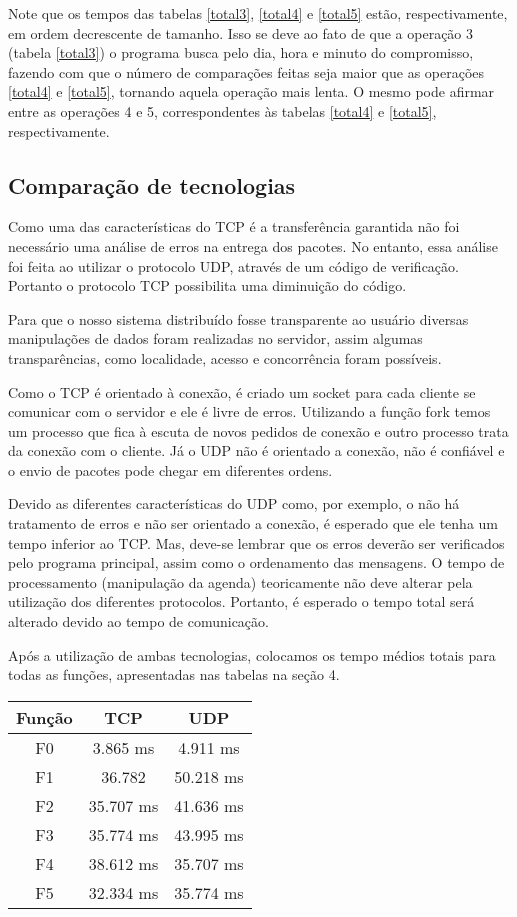 \documentclass[10pt,a4paper]{article}
\begin{document}
  Note que os tempos das tabelas \ref{total3}, \ref{total4} e
  \ref{total5} estão, respectivamente, em ordem decrescente de
  tamanho. Isso se deve ao fato de que a operação 3 (tabela
  \ref{total3}) o programa busca pelo dia, hora e minuto do
  compromisso, fazendo com que o número de comparações feitas seja
  maior que as operações \ref{total4} e \ref{total5}, tornando aquela
  operação mais lenta. O mesmo pode afirmar entre as operações 4 e 5,
  correspondentes às tabelas \ref{total4} e \ref{total5}, respectivamente.


  \subsection{Comparação de tecnologias}
Como uma das características do TCP é a transferência garantida não foi necessário uma análise de erros na entrega
dos pacotes. No entanto, essa análise foi feita ao utilizar o protocolo UDP, através de um código de verificação.
Portanto o protocolo TCP possibilita uma diminuição do código.

Para que o nosso sistema distribuído fosse transparente ao usuário diversas manipulações de dados foram realizadas
no servidor, assim algumas transparências, como localidade, acesso e concorrência foram possíveis.

Como o TCP é orientado à conexão, é criado um socket para cada cliente se comunicar com o servidor e ele é livre
de erros. Utilizando a função fork temos um processo que fica à escuta de novos pedidos de conexão e outro processo
trata da conexão com o cliente. Já o UDP não é orientado a conexão, não é confiável e o envio de pacotes pode chegar em
diferentes ordens.

Devido as diferentes características do UDP como, por exemplo, o não há tratamento de erros e não ser orientado a
conexão, é esperado que ele tenha um tempo inferior ao TCP. Mas, deve-se lembrar que os erros deverão ser verificados
pelo programa principal, assim como o ordenamento das mensagens.
O tempo de processamento (manipulação da agenda) teoricamente não deve alterar pela utilização dos diferentes
protocolos.
Portanto, é esperado o tempo total será alterado devido ao tempo de comunicação.

Após a utilização de ambas tecnologias, colocamos os tempo médios totais para todas as funções, apresentadas nas tabelas na seção 4.
\begin{table}[h!]
  \begin{center}
    \begin{tabular}{ccc}
      
      Função& TCP&  UDP \\
      \hline
      F0 & 3.865 ms & 4.911 ms\\
      F1 & 36.782 & 50.218 ms\\
      F2 & 35.707 ms & 41.636 ms\\
      F3 & 35.774 ms & 43.995 ms\\
      F4 & 38.612 ms & 35.707 ms\\
      F5 & 32.334 ms & 35.774 ms
    \end{tabular}
  \end{center}
\end{table}
\end{document}
